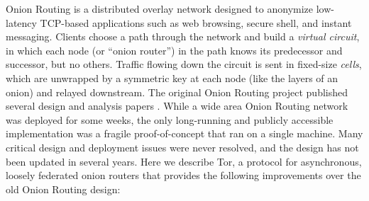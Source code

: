 \documentclass[times,10pt,twocolumn]{article}
\begin{document}
Onion Routing is a distributed overlay network designed to anonymize
low-latency TCP-based applications such as web browsing, secure shell,
and instant messaging. Clients choose a path through the network and
build a \emph{virtual circuit}, in which each node (or ``onion router'') 
in the path knows its
predecessor and successor, but no others. Traffic flowing down the circuit
is sent in fixed-size \emph{cells}, which are unwrapped by a symmetric key
at each node (like the layers of an onion) and relayed downstream. The
original Onion Routing project published several design and analysis
papers
\cite{or-ih96,or-jsac98,or-discex00,or-pet00}. While
a wide area Onion Routing network was deployed for some weeks,
the only long-running and publicly accessible
implementation was a fragile proof-of-concept that ran on a single
machine.
%
Many critical design and deployment issues were never resolved,
and the design has not been updated in several years.
Here we describe Tor, a protocol for asynchronous, loosely
federated onion routers that provides the following improvements over
the old Onion Routing design:
\end{document}
